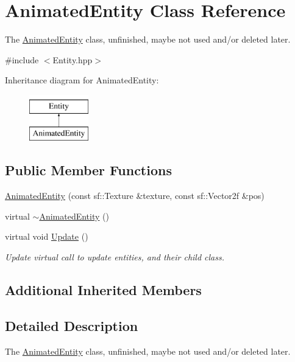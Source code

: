 \hypertarget{class_animated_entity}{\section{Animated\-Entity Class Reference}
\label{class_animated_entity}
}


The \hyperlink{class_animated_entity}{Animated\-Entity} class, unfinished, maybe not used and/or deleted later.  




{\ttfamily \#include $<$Entity.\-hpp$>$}

Inheritance diagram for Animated\-Entity\-:\begin{figure}[H]
\begin{center}
\leavevmode
\includegraphics[height=2.000000cm]{class_animated_entity}
\end{center}
\end{figure}
\subsection*{Public Member Functions}
\begin{DoxyCompactItemize}
\item 
\hyperlink{class_animated_entity_af4dfa59419bc469aa24607979e48ba5d}{Animated\-Entity} (const sf\-::\-Texture \&texture, const sf\-::\-Vector2f \&pos)
\item 
virtual \hyperlink{class_animated_entity_a11bb45960aebeed89cf0f8cd3aec4ea2}{$\sim$\-Animated\-Entity} ()
\item 
virtual void \hyperlink{class_animated_entity_af12d83ab3604a110e37c66c33206104b}{Update} ()
\begin{DoxyCompactList}\small\item\em Update virtual call to update entities, and their child class. \end{DoxyCompactList}\end{DoxyCompactItemize}
\subsection*{Additional Inherited Members}


\subsection{Detailed Description}
The \hyperlink{class_animated_entity}{Animated\-Entity} class, unfinished, maybe not used and/or deleted later. 

